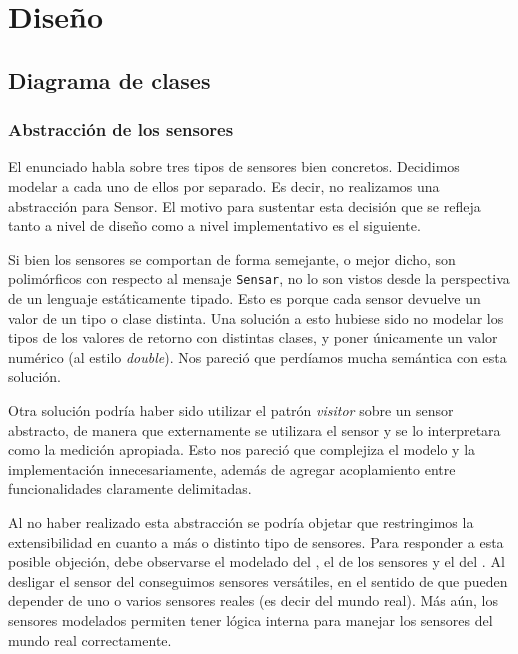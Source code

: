 \section{Dise\~no}

  \subsection{Diagrama de clases}

      \subsubsection{Abstracci\'on de los sensores}
          El enunciado habla sobre tres tipos de sensores bien concretos.
          Decidimos modelar a cada uno de ellos por separado. Es decir, no realizamos
          una abstracci\'on para Sensor. El motivo para sustentar esta decisi\'on
          que se refleja tanto a nivel de dise\~no como a nivel implementativo es
          el siguiente.

          Si bien los sensores se comportan de forma semejante,
          o mejor dicho, son polim\'orficos con respecto al mensaje \texttt{Sensar},
          no lo son vistos desde la perspectiva de un lenguaje est\'aticamente tipado.
          Esto es porque cada sensor devuelve un valor de un tipo o clase distinta.
          Una soluci\'on a esto hubiese sido no modelar los tipos de los valores de
          retorno con distintas clases, y poner \'unicamente un valor num\'erico
          (al estilo \textit{double}). Nos
          pareci\'o que perd\'iamos mucha sem\'antica con esta soluci\'on.

          Otra soluci\'on podr\'ia haber sido utilizar el patr\'on \textit{visitor} sobre
          un sensor abstracto, de manera que externamente se utilizara el sensor y se lo
          interpretara como la medici\'on apropiada. Esto nos pareci\'o que complejiza el
          modelo y la implementaci\'on innecesariamente, adem\'as de agregar acoplamiento
          entre funcionalidades claramente delimitadas.

          Al no haber realizado esta abstracci\'on se podr\'ia objetar que restringimos
          la extensibilidad en cuanto a m\'as o distinto tipo de sensores.
          Para responder a esta posible objeci\'on, debe observarse el modelado del
          \condiciones{}, el de los sensores y el del \arduino{}.
          Al desligar el sensor del \arduino{} conseguimos
          sensores vers\'atiles, en el sentido de que pueden depender de uno o varios sensores
          reales (es decir del mundo real). M\'as a\'un, los sensores modelados
          permiten tener l\'ogica interna para manejar los sensores del mundo real
          correctamente.


